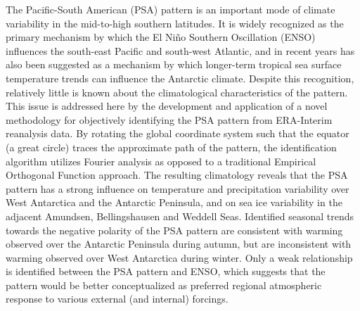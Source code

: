 The Pacific-South American (PSA) pattern is an important mode of climate variability in the mid-to-high southern latitudes. It is widely recognized as the primary mechanism by which the El Ni\~{n}o Southern Oscillation (ENSO) influences the south-east Pacific and south-west Atlantic, and in recent years has also been suggested as a mechanism by which longer-term tropical sea surface temperature trends can influence the Antarctic climate. Despite this recognition, relatively little is known about the climatological characteristics of the pattern. This issue is addressed here by the development and application of a novel methodology for objectively identifying the PSA pattern from ERA-Interim reanalysis data. By rotating the global coordinate system such that the equator (a great circle) traces the approximate path of the pattern, the identification algorithm utilizes Fourier analysis as opposed to a traditional Empirical Orthogonal Function approach. The resulting climatology reveals that the PSA pattern has a strong influence on temperature and precipitation variability over West Antarctica and the Antarctic Peninsula, and on sea ice variability in the adjacent Amundsen, Bellingshausen and Weddell Seas. Identified seasonal trends towards the negative polarity of the PSA pattern are consistent with warming observed over the Antarctic Peninsula during autumn, but are inconsistent with warming observed over West Antarctica during winter. Only a weak relationship is identified between the PSA pattern and ENSO, which suggests that the pattern would be better conceptualized as preferred regional atmospheric response to various external (and internal) forcings.